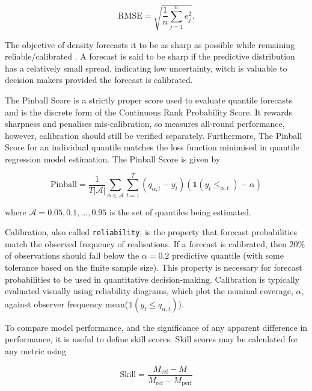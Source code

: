 \documentclass[]{elsarticle} %
\begin{document}
\begin{equation}
  \mathrm{RMSE} = \sqrt{\frac{1}{n} \sum_{j=1}^n e_j^2} .
  \label{eq:RMSE}
\end{equation}

The objective of density forecasts it to be as sharp as possible while remaining reliable/calibrated \citep{Gneiting2007a}. A forecast is said to be sharp if the predictive distribution has a relatively small spread, indicating low uncertainty, witch is valuable to decision makers provided the forecast is calibrated.

The Pinball Score is a strictly proper score used to evaluate quantile forecasts and is the discrete form of the Continuous Rank Probability Score. It rewards sharpness and penalises mis-calibration, so measures all-round performance, however, calibration should still be verified separately. Furthermore,
The Pinball Score for an individual quantile matches the loss function minimised in quantile regression model estimation. The Pinball Score is given by

\begin{equation}
    \text{Pinball} = 
    \frac{1}{T|\mathcal{A}|} \sum_{\alpha \in \mathcal{A}} \sum_{t=1}^T
 \left(q_{\alpha,t} - y_{t} \right)
 \left(\mathbb{1}(y_{t}\leq_{\alpha,t})-\alpha \right)
 \label{eq:pinball}
\end{equation}

where \(\mathcal{A} = {0.05,0.1,...,0.95}\) is the set of quantiles being estimated.

Calibration, also called \texttt{reliability}, is the property that forecast probabilities match the observed frequency of realisations. If a forecast is calibrated, then \(20\%\) of observations should fall below the \(\alpha=0.2\) predictive quantile (with some tolerance based on the finite sample size). This property is necessary for forecast probabilities to be used in quantitative decision-making. Calibration is typically evaluated visually using reliability diagrams, which plot the nominal coverage, \(\alpha\), against observer frequency mean(\(\mathbb{1}(y_{t}\le q_{\alpha,t})\)).

To compare model performance, and the significance of any apparent difference in performance, it is useful to define skill scores. Skill scores may be calculated for any metric using

\begin{equation}
     \text{Skill} = \frac{M_\text{ref} - M}{M_\text{ref} - M_\text{perf}} \label{eq:skillscore}
\end{equation}
\end{document}
